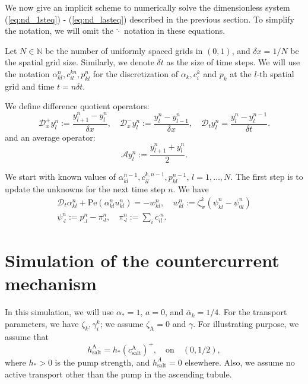 \documentclass{article}
\begin{document}
We now give an implicit scheme to numerically solve the dimensionless system (\ref{eq:nd_1steq}) - (\ref{eq:nd_lasteq}) described in the previous section.
To simplify the notation, we will omit the $\hat{\cdot}$ notation in these equations.

Let $N\in \mathbb{N}$ be the number of uniformly spaced grids in $(0,1)$, and $\delta x = 1/N$ be the spatial grid size.
Similarly, we denote $\delta t$ as the size of time steps.
We will use the notation $\alpha^{n}_{kl},c_{il}^{kn}, p_{kl}^{n}$ for the discretization of $\alpha_k,c_i^k$ and $p_k$ at the $l$-th spatial grid and time $t = n\delta t$.

We define difference quotient operators:
\begin{equation}
    \mathcal{D}_x^+y^n_l:= \frac{y^n_{l+1}-y^n_{l}}{\delta x},\quad \mathcal{D}_x^- y^n_l :=\frac{y^n_l-y^n_{l-1}}{\delta x},\quad \mathcal{D}_t y^n_l = \frac{y^n_l - y^{n-1}_l}{\delta t}.
\end{equation}
and an average operator:
\begin{equation}
    \mathcal{A} y_l^n := \frac{y^n_{l+1}+y^n_l}{2}.
\end{equation}

We start with known values of $\alpha^{n-1}_{kl},c_{il}^{k,n-1}, p_{kl}^{n-1}$, $l = 1,\dots,N$.
The first step is to update the unknowns for the next time step $n$.
We have
\begin{gather}
    \mathcal{D}_t \alpha_{kl}^n +\mathrm{Pe}(\alpha_{kl}^n u_{kl}^n) = -w_{kl}^{n},\quad w_{kl}^n:=\zeta_\mathrm{w}^k\left( \psi_{kl}^n-\psi_{0l}^n \right)\\
    \psi_{\cdot l}^n:= p_{.l}^n - \pi_{\cdot l}^n,\quad \pi_{\cdot l}^n:= \sum_i c_{il}^{\cdot n}.\nonumber
\end{gather}


\section{Simulation of the countercurrent mechanism}

In this simulation, we will use $\alpha_* = 1$, $a=0$, and $\bar{\alpha}_k = 1/4$.
For the transport parameters, we have $\zeta_k,\gamma_i^k$; we assume $\zeta_\mathrm{A} = 0$ and $\gamma$.
    For illustrating purpose, we assume that
    \begin{equation}
        h_\mathrm{salt}^\mathrm{A} = h_*(c_\mathrm{salt}^\mathrm{A})^+,\quad \text{on}\quad (0,1/2),
    \end{equation}
        where $h_*>0$ is the pump strength, and $h^A_\mathrm{salt} = 0$ elsewhere.
    Also, we assume no active transport other than the pump in the ascending tubule.
\end{document}

